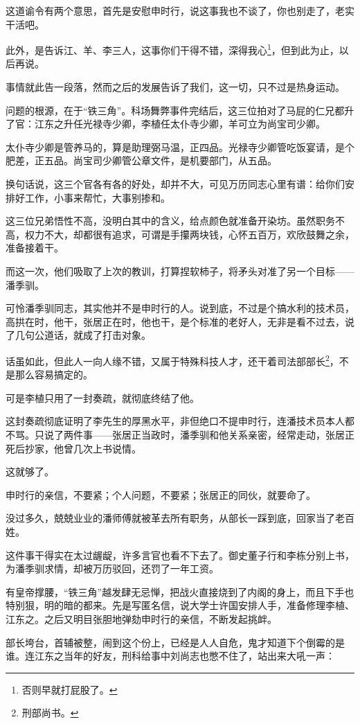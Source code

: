 \begin{multicols}{\theparacolNo}
		这道谕令有两个意思，首先是安慰申时行，说这事我也不谈了，你也别走了，老实干活吧。

		此外，是告诉江、羊、李三人，这事你们干得不错，深得我心\footnote{否则早就打屁股了。}，但到此为止，以后再说。

		事情就此告一段落，然而之后的发展告诉了我们，这一切，只不过是热身运动。

		问题的根源，在于“铁三角”。科场舞弊事件完结后，这三位拍对了马屁的仁兄都升了官：江东之升任光禄寺少卿，李植任太仆寺少卿，羊可立为尚宝司少卿。

		太仆寺少卿是管养马的，算是助理弼马温，正四品。光禄寺少卿管吃饭宴请，是个肥差，正五品。尚宝司少卿管公章文件，是机要部门，从五品。

		换句话说，这三个官各有各的好处，却并不大，可见万历同志心里有谱：给你们安排好工作，小事来帮忙，大事别掺和。

		这三位兄弟悟性不高，没明白其中的含义，给点颜色就准备开染坊。虽然职务不高，权力不大，却都很有追求，可谓是手攥两块钱，心怀五百万，欢欣鼓舞之余，准备接着干。

		而这一次，他们吸取了上次的教训，打算捏软柿子，将矛头对准了另一个目标——潘季驯。

		可怜潘季驯同志，其实他并不是申时行的人。说到底，不过是个搞水利的技术员，高拱在时，他干，张居正在时，他也干，是个标准的老好人，无非是看不过去，说了几句公道话，就成了打击对象。

		话虽如此，但此人一向人缘不错，又属于特殊科技人才，还干着司法部部长\footnote{刑部尚书。}，不是那么容易搞定的。

		可是李植只用了一封奏疏，就彻底终结了他。

		这封奏疏彻底证明了李先生的厚黑水平，非但绝口不提申时行，连潘技术员本人都不骂。只说了两件事——张居正当政时，潘季驯和他关系亲密，经常走动，张居正死后抄家，他曾几次上书说情。

		这就够了。

		申时行的亲信，不要紧；个人问题，不要紧；张居正的同伙，就要命了。

		没过多久，兢兢业业的潘师傅就被革去所有职务，从部长一踩到底，回家当了老百姓。

		这件事干得实在太过龌龊，许多言官也看不下去了。御史董子行和李栋分别上书，为潘季驯求情，却被万历驳回，还罚了一年工资。

		有皇帝撑腰，“铁三角”越发肆无忌惮，把战火直接烧到了内阁的身上，而且下手也特别狠，明的暗的都来。先是写匿名信，说大学士许国安排人手，准备修理李植、江东之。之后又明目张胆地弹劾申时行的亲信，不断发起挑衅。

		部长垮台，首辅被整，闹到这个份上，已经是人人自危，鬼才知道下个倒霉的是谁。连江东之当年的好友，刑科给事中刘尚志也憋不住了，站出来大吼一声：


\end{multicols}
